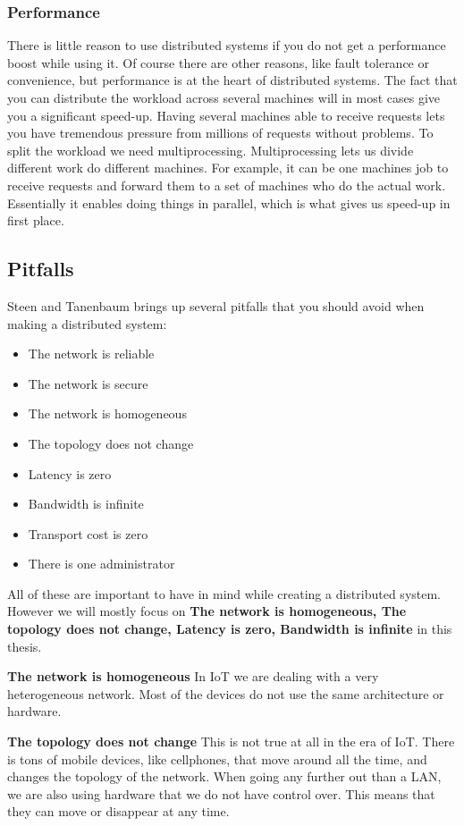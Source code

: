 \subsubsection{Performance}
There is little reason to use distributed systems if you do not get a performance boost while using it. Of course there are other reasons, like fault tolerance or convenience, but performance is at the heart of distributed systems. The fact that you can distribute the workload across several machines will in most cases give you a significant speed-up. Having several machines able to receive requests lets you have tremendous pressure from millions of requests without problems.
To split the workload we need multiprocessing. Multiprocessing lets us divide different work do different machines. For example, it can be one machines job to receive requests and forward them to a set of machines who do the actual work. Essentially it enables doing things in parallel, which is what gives us speed-up in first place.

\subsection{Pitfalls}
Steen and Tanenbaum \cite{steen_distributed_2017} brings up several pitfalls that you should avoid when making a distributed system:
\begin{itemize}
    \item The network is reliable
    \item The network is secure
    \item The network is homogeneous
    \item The topology does not change
    \item Latency is zero
    \item Bandwidth is infinite
    \item Transport cost is zero
    \item There is one administrator
\end{itemize}
All of these are important to have in mind while creating a distributed system. However we will mostly focus on \textbf{The network is homogeneous, The topology does not change, Latency is zero, Bandwidth is infinite} in this thesis. 

\textbf{The network is homogeneous}
In IoT we are dealing with a very heterogeneous network. Most of the devices do not use the same architecture or hardware.

\textbf{The topology does not change}
This is not true at all in the era of IoT. There is tons of mobile devices, like cellphones, that move around all the time, and changes the topology of the network. When going any further out than a LAN, we are also using hardware that we do not have control over. This means that they can move or disappear at any time.

